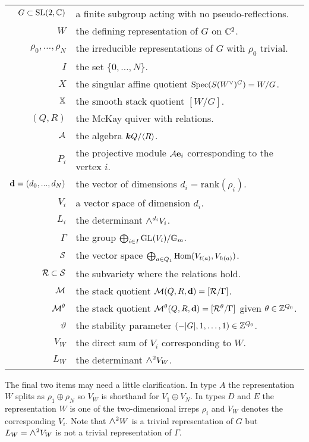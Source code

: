 \documentclass{amsart}
\theoremstyle{definition}
\newcommand{\Wedge}{\mbox{\scalebox{1.2}{$\wedge$}}}
\newcommand\VW{V_W}
\newcommand\W{W}
\begin{document}
\begin{centering}
\begin{tabular}{r l}
    $G \subset \operatorname{SL}(2,\mathbb{C})$ & a finite subgroup acting with no pseudo-reflections. \\
    $\W$ & the defining representation of $G$ on $\mathbb{C}^2$. \\
    $\rho_0, \ldots, \rho_N$ & the irreducible representations of $G$ with $\rho_0$ trivial. \\
    $I$ & the set $\{0,\ldots,N\}$.  \\
    $X$ & the singular affine quotient $\Spec(S(\W^\vee)^G) = \W/G$. \\
    $\mathbb{X}$ & the smooth stack quotient $[\W/G]$. \\
    $(Q,R)$ & the McKay quiver with relations. \\
    $\mathcal{A}$ & the algebra ${\boldsymbol{k}} Q/ \langle R\rangle$. \\
    $P_i$ & the projective module $\mathcal{A}\mathbf{e}_i$ corresponding to the vertex $i$. \\
    $\mathbf{d}=(d_0,..., d_N)$ & the vector of dimensions $d_i=\text{rank}(\rho_i)$. \\
    $V_i$ & a vector space of dimension $d_i$. \\
    $L_i$ & the determinant $\Wedge^{d_i} V_i$. \\
     $\Gamma$ & the group $\bigoplus_{i \in I} \text{GL}(V_i) / \mathbb{G}_m$. \\
    $\mathcal{S}$ & the vector space $\bigoplus_{a \in Q_1} \operatorname{Hom}(V_{t(a)}, V_{h(a)})$. \\
  $\mathcal{R}\subset \mathcal{S}$ & the subvariety where the relations hold. \\
    $\mathcal{M}$ & the stack quotient  $\mathcal{M}(Q,R,\mathbf{d})=[\mathcal{R}/\Gamma]$. \\
    $\mathcal{M}^\theta$ & the stack quotient $\mathcal{M}^\theta(Q,R,\mathbf{d})=[\mathcal{R}^\theta/\Gamma]$ given $\theta \in \mathbb{Z}^{Q_0}$. \\
    $\vartheta$ & the stability parameter $(-|G|,1, \ldots, 1) \in \mathbb{Z}^{Q_0}$. \\
   $\VW$ & the direct sum of $V_i$ corresponding to $W$. \\
    $L_W$ & the determinant $\Wedge^2 \VW$. \\
    \end{tabular}
\end{centering}
 
The final two items may need a little clarification. In type $A$ the representation $W$ splits as $\rho_1\oplus \rho_N$ so $V_W$ is shorthand for $V_1\oplus V_N$. In types $D$ and $E$ the representation $W$ is one of the two-dimensional irreps $\rho_i$ and $V_W$ denotes the corresponding $V_i$.  Note that $\Wedge^2 W$ is a trivial representation of $G$ but $L_W=\Wedge^2\VW$ is not a trivial representation of $\Gamma$. 
\end{document}
